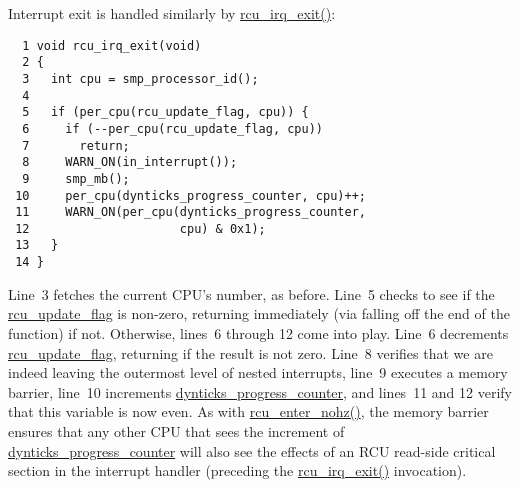  \QuickQuizEnd

 \QuickQuizEnd

Interrupt exit is handled similarly by
\url{rcu_irq_exit()}:

{ \scriptsize
\begin{verbatim}
  1 void rcu_irq_exit(void)
  2 {
  3   int cpu = smp_processor_id();
  4 
  5   if (per_cpu(rcu_update_flag, cpu)) {
  6     if (--per_cpu(rcu_update_flag, cpu))
  7       return;
  8     WARN_ON(in_interrupt());
  9     smp_mb();
 10     per_cpu(dynticks_progress_counter, cpu)++;
 11     WARN_ON(per_cpu(dynticks_progress_counter,
 12                     cpu) & 0x1);
 13   }
 14 }
\end{verbatim}
}

Line~3 fetches the current CPU's number, as before.
Line~5 checks to see if the \url{rcu_update_flag} is
non-zero, returning immediately (via falling off the end of the
function) if not.
Otherwise, lines~6 through 12 come into play.
Line~6 decrements \url{rcu_update_flag}, returning
if the result is not zero.
Line~8 verifies that we are indeed leaving the outermost
level of nested interrupts, line~9 executes a memory barrier,
line~10 increments \url{dynticks_progress_counter},
and lines~11 and 12 verify that this variable is now even.
As with \url{rcu_enter_nohz()}, the memory barrier ensures that
any other CPU that sees the increment of
\url{dynticks_progress_counter}
will also see the effects of an RCU read-side critical section
in the interrupt handler (preceding the \url{rcu_irq_exit()}
invocation).

